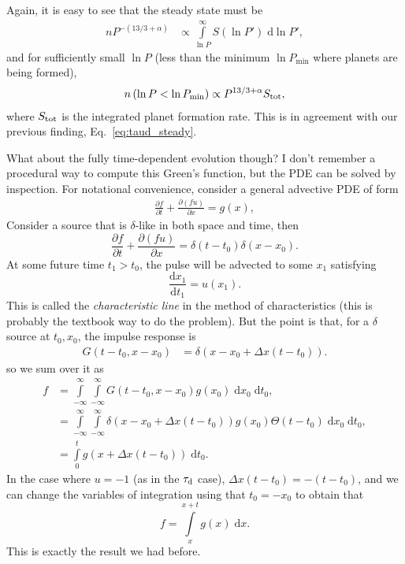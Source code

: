 \documentclass[12pt]{article}
\newcommand*{\rd}[2]{\frac{\mathrm{d}#1}{\mathrm{d}#2}}
\newcommand*{\pd}[2]{\frac{\partial#1}{\partial#2}}
\newcommand*{\p}[1]{\left(#1\right)}
\begin{document}
Again, it is easy to see that the steady state must be
\begin{align}
    nP^{-(13/3 + \alpha)}
        &\propto
            \int\limits_{\ln P}^\infty
                S(\ln P')\;\mathrm{d}\ln P',
\end{align}
and for sufficiently small $\ln P$ (less than the minimum $\ln P_{\min}$ where
planets are being formed),
\begin{align}
    n\p{\ln P < \ln P_{\min}}
        \propto
            P^{13/3 + \alpha}S_{\rm tot},\label{eq:lnp_steady}
\end{align}
where $S_{\rm tot}$ is the integrated planet formation rate.
This is in agreement with our previous finding, Eq.~\eqref{eq:taud_steady}.

What about the fully time-dependent evolution though?
I don't remember a procedural way to compute this Green's function, but the PDE
can be solved by inspection.
For notational convenience, consider a general advective PDE of form
\begin{align}
    \pd{f}{t} + \pd{(fu)}{x} = g(x),
\end{align}
Consider a source that is $\delta$-like in both space and time, then
\begin{equation}
    \pd{f}{t} + \pd{(fu)}{x} = \delta\p{t - t_0}\delta\p{x - x_0}.
\end{equation}
At some future time $t_1 > t_0$, the pulse will be advected to some $x_1$
satisfying
\begin{equation}
    \rd{x_1}{t_1} = u(x_1).
\end{equation}
This is called the \emph{characteristic line} in the method of characteristics
(this is probably the textbook way to do the problem).
But the point is that, for a $\delta$ source at $t_0, x_0$, the impulse response
is
\begin{align}
    G\p{t - t_0, x - x_0}
        &=
            \delta\p{x - x_0 + \Delta x\p{t - t_0}}.
\end{align}
so we sum over it as
\begin{align}
    f
        &=
            \int\limits_{-\infty}^\infty
            \int\limits_{-\infty}^\infty
            G\p{t - t_0, x - x_0}
            g(x_0)
            \;\mathrm{d}x_0\;\mathrm{d}t_0,\\
        &=
            \int\limits_{-\infty}^\infty
            \int\limits_{-\infty}^\infty
            \delta\p{x - x_0 + \Delta x\p{t - t_0}}
            g(x_0)
            \Theta\p{t - t_0}
            \;\mathrm{d}x_0\;\mathrm{d}t_0,\\
        &=
            \int\limits_{0}^t
            g(x + \Delta x\p{t - t_0})
            \;\mathrm{d}t_0.
\end{align}
In the case where $u = -1$ (as in the $\tau_{\rm d}$ case), $\Delta x\p{t - t_0}
= -\p{t - t_0}$, and we can change the variables of integration using that $t_0=
-x_0$ to obtain that
\begin{equation}
    f = \int\limits_{x}^{x + t}
        g\p{x}\;\mathrm{d}x.
\end{equation}
This is exactly the result we had before.
\end{document}

